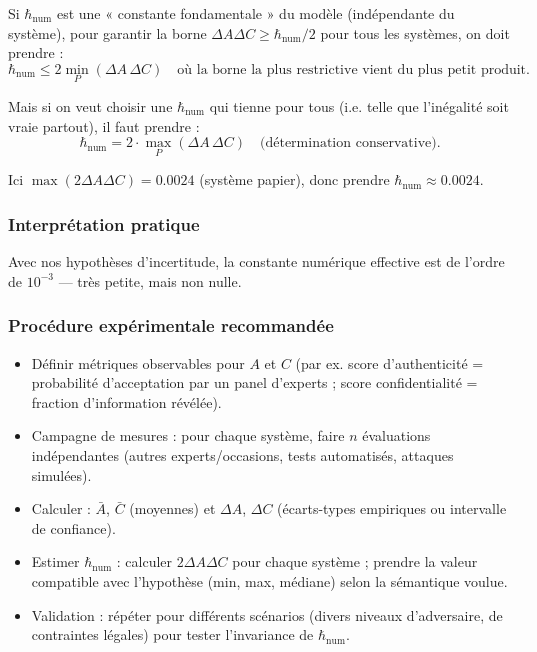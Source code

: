 \documentclass[12pt,a4paper]{article}
\begin{document}
	 Si $\hbar_{\text{num}}$ est une « constante fondamentale » du modèle (indépendante du système), pour garantir la borne $\Delta A \Delta C \geq \hbar_{\text{num}}/2$ pour tous les systèmes, on doit prendre :
	 \[
	 \hbar_{\text{num}} \leq 2 \min_P (\Delta A \, \Delta C)
	 \quad \text{où la borne la plus restrictive vient du plus petit produit}.
	 \]
	 
	 Mais si on veut choisir une $\hbar_{\text{num}}$ qui tienne pour tous (i.e. telle que l'inégalité soit vraie partout), il faut prendre :
	 \[
	 \hbar_{\text{num}} = 2 \cdot \max_P (\Delta A \, \Delta C)
	 \quad \text{(détermination conservative)}.
	 \]
	 
	 Ici $\max (2 \Delta A \Delta C) = 0.0024$ (système papier), donc prendre $\hbar_{\text{num}} \approx 0.0024$.
	 
	 \subsubsection*{Interprétation pratique}
	 Avec nos hypothèses d'incertitude, la constante numérique effective est de l'ordre de $10^{-3}$ — très petite, mais non nulle.
	 
	 \subsubsection*{Procédure expérimentale recommandée}
	 \begin{itemize}
	 	\item Définir métriques observables pour $A$ et $C$ (par ex. score d'authenticité = probabilité d'acceptation par un panel d'experts ; score confidentialité = fraction d'information révélée).
	 	\item Campagne de mesures : pour chaque système, faire $n$ évaluations indépendantes (autres experts/occasions, tests automatisés, attaques simulées).
	 	\item Calculer : $\bar{A}$, $\bar{C}$ (moyennes) et $\Delta A$, $\Delta C$ (écarts-types empiriques ou intervalle de confiance).
	 	\item Estimer $\hbar_{\text{num}}$ : calculer $2 \Delta A \Delta C$ pour chaque système ; prendre la valeur compatible avec l'hypothèse (min, max, médiane) selon la sémantique voulue.
	 	\item Validation : répéter pour différents scénarios (divers niveaux d'adversaire, de contraintes légales) pour tester l'invariance de $\hbar_{\text{num}}$.
	 \end{itemize}
	 
\end{document}
